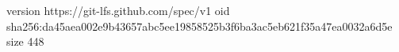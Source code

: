 version https://git-lfs.github.com/spec/v1
oid sha256:da45aea002e9b43657abc5ee19858525b3f6ba3ac5eb621f35a47ea0032a6d5e
size 448
